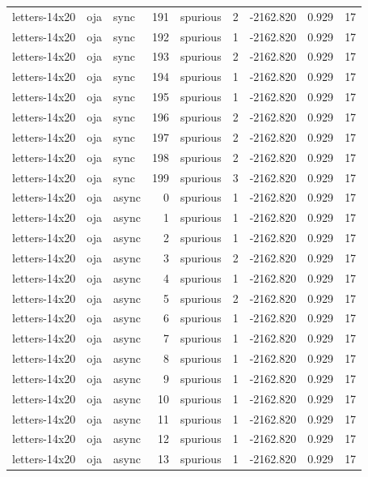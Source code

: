 \begin{tabular}{lllrlrrrr}
letters-14x20 & oja & sync & 191 & spurious & 2 & -2162.820 & 0.929 & 17 \\
letters-14x20 & oja & sync & 192 & spurious & 1 & -2162.820 & 0.929 & 17 \\
letters-14x20 & oja & sync & 193 & spurious & 2 & -2162.820 & 0.929 & 17 \\
letters-14x20 & oja & sync & 194 & spurious & 1 & -2162.820 & 0.929 & 17 \\
letters-14x20 & oja & sync & 195 & spurious & 1 & -2162.820 & 0.929 & 17 \\
letters-14x20 & oja & sync & 196 & spurious & 2 & -2162.820 & 0.929 & 17 \\
letters-14x20 & oja & sync & 197 & spurious & 2 & -2162.820 & 0.929 & 17 \\
letters-14x20 & oja & sync & 198 & spurious & 2 & -2162.820 & 0.929 & 17 \\
letters-14x20 & oja & sync & 199 & spurious & 3 & -2162.820 & 0.929 & 17 \\
letters-14x20 & oja & async & 0 & spurious & 1 & -2162.820 & 0.929 & 17 \\
letters-14x20 & oja & async & 1 & spurious & 1 & -2162.820 & 0.929 & 17 \\
letters-14x20 & oja & async & 2 & spurious & 1 & -2162.820 & 0.929 & 17 \\
letters-14x20 & oja & async & 3 & spurious & 2 & -2162.820 & 0.929 & 17 \\
letters-14x20 & oja & async & 4 & spurious & 1 & -2162.820 & 0.929 & 17 \\
letters-14x20 & oja & async & 5 & spurious & 2 & -2162.820 & 0.929 & 17 \\
letters-14x20 & oja & async & 6 & spurious & 1 & -2162.820 & 0.929 & 17 \\
letters-14x20 & oja & async & 7 & spurious & 1 & -2162.820 & 0.929 & 17 \\
letters-14x20 & oja & async & 8 & spurious & 1 & -2162.820 & 0.929 & 17 \\
letters-14x20 & oja & async & 9 & spurious & 1 & -2162.820 & 0.929 & 17 \\
letters-14x20 & oja & async & 10 & spurious & 1 & -2162.820 & 0.929 & 17 \\
letters-14x20 & oja & async & 11 & spurious & 1 & -2162.820 & 0.929 & 17 \\
letters-14x20 & oja & async & 12 & spurious & 1 & -2162.820 & 0.929 & 17 \\
letters-14x20 & oja & async & 13 & spurious & 1 & -2162.820 & 0.929 & 17 \\

\end{tabular}
